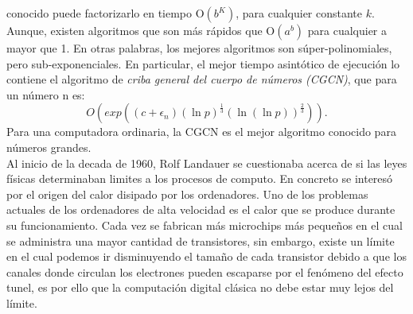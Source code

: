 conocido puede factorizarlo en tiempo O$(b^K)$, para cualquier constante $k$. Aunque, existen algoritmos que son más rápidos que O$(a^b)$ para cualquier a 
mayor que 1. En otras palabras, los mejores algoritmos son súper-polinomiales, pero sub-exponenciales. En particular, el mejor tiempo
asintótico de ejecución lo contiene el algoritmo de \textit{criba general del cuerpo de números\cite{Agrios2003} (CGCN)}, que para un número n es:
\begin{equation}
    O\left(exp\left(\left(c+\epsilon_n\right) \left(\ln p\right)^\frac{1}{3} \left(\ln(\ln p)\right)^\frac{2}{3} \right) \right).
    \label{eq:O(clasico)}
\end{equation}
Para una computadora ordinaria, la CGCN es el mejor algoritmo conocido para números grandes.\\
Al inicio de la decada de 1960, Rolf Landauer se cuestionaba acerca de si las leyes físicas determinaban limites a los procesos de computo. En concreto
se interesó por el origen del calor disipado por los ordenadores. Uno de los problemas actuales de los ordenadores de alta velocidad
es el calor que se produce durante su funcionamiento. Cada vez se fabrican más microchips más pequeños en el cual se administra una mayor cantidad de transistores, sin embargo, 
existe un límite en el cual podemos ir disminuyendo el tamaño de cada transistor debido a que los canales donde circulan los electrones pueden escaparse por el fenómeno del 
efecto tunel, es por ello que la computación digital clásica no debe estar muy lejos del límite.\\\\

